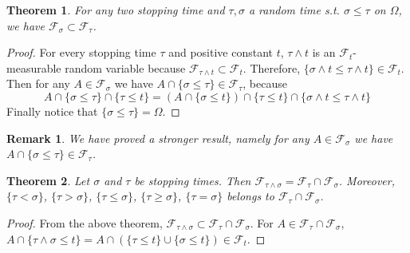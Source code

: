 \documentclass{article}
\newtheorem{Thm}{Theorem}[section]
\newtheorem*{Rk}{Remark}
\theoremstyle{definition}
\renewcommand{\leq}{\leqslant}
\renewcommand{\geq}{\geqslant}
\newcommand{\<}{\left\langle}
\renewcommand{\>}{\right\rangle}
\begin{document}
\begin{Thm}
    For any two stopping time and $\tau,\sigma$ a random time s.t. $\sigma\leq \tau$ on $\Omega$, we have $\mathcal{F}_\sigma\subset\mathcal{F}_\tau$.
\end{Thm}
\begin{proof}
    For every stopping time $\tau$ and positive constant $t$, $\tau\wedge t$ is an $\mathcal{F}_t$-measurable random variable
    because $\mathcal{F}_{\tau\wedge t}\subset\mathcal{F}_t$. Therefore, $\{\sigma\wedge t\leq \tau\wedge t\}\in \mathcal{F}_t$.
    Then for any $A\in\mathcal{F}_\sigma$ we have $A\cap\{\sigma\leq \tau\}\in\mathcal{F}_\tau$, because
    \[ A\cap\{\sigma\leq \tau\}\cap \{\tau\leq t\}= (A\cap \{\sigma\leq t\})\cap \{\tau\leq t\}\cap \{\sigma\wedge t\leq \tau\wedge t\}\]
    Finally notice that $\{\sigma\leq \tau\}=\Omega$.
\end{proof}
\begin{Rk}
    We have proved a stronger result, namely
    for any $A\in\mathcal{F}_\sigma$ we have $A\cap\{\sigma\leq \tau\}\in\mathcal{F}_\tau$.
\end{Rk}
\begin{Thm}
    Let $\sigma$ and $\tau$ be stopping times. Then $\mathcal{F}_{\tau\wedge \sigma}=\mathcal{F}_\tau\cap\mathcal{F}_\sigma$.\newline 
    Moreover, $\{\tau<\sigma\}$, $\{\tau>\sigma\}$, $\{\tau\leq \sigma\}$, $\{\tau\geq \sigma\}$, $\{\tau=\sigma\}$ belongs to $\mathcal{F}_\tau\cap\mathcal{F}_\sigma$.
\end{Thm}
\begin{proof}
    From the above theorem, $\mathcal{F}_{\tau\wedge \sigma}\subset \mathcal{F}_{\tau}\cap\mathcal{F}_\sigma$.\newline 
    For $A\in \mathcal{F}_{\tau}\cap\mathcal{F}_\sigma$, $A\cap \{\tau\wedge \sigma\leq t\}=A\cap(\{\tau\leq t\}\cup\{\sigma\leq t\})\in\mathcal{F}_t$.
\end{proof}
\end{document}
